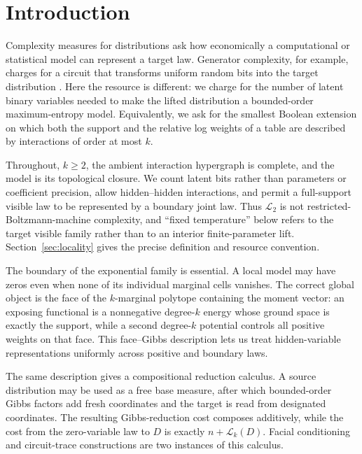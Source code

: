 \documentclass{article}
\newcommand{\LC}{\mathcal{L}}
\begin{document}
\section{Introduction}

Complexity measures for distributions ask how economically a computational or
statistical model can represent a target law.  Generator complexity, for
example, charges for a circuit that transforms uniform random bits into the
target distribution \cite{vi10}.  Here the resource is different: we charge for
the number of latent binary variables needed to make the lifted distribution a
bounded-order maximum-entropy model.  Equivalently, we ask for the smallest
Boolean extension on which both the support and the relative log weights of a
table are described by interactions of order at most $k$.

Throughout, $k\ge2$, the ambient interaction hypergraph is complete, and the
model is its topological closure.  We count latent bits rather than parameters or
coefficient precision, allow hidden--hidden interactions, and permit a
full-support visible law to be represented by a boundary joint law.  Thus
$\LC_2$ is not restricted-Boltzmann-machine complexity, and ``fixed
temperature'' below refers to the target visible family rather than to an
interior finite-parameter lift.  Section~\ref{sec:locality} gives the precise
definition and resource convention.

The boundary of the exponential family is essential.  A local model may have
zeros even when none of its individual marginal cells vanishes.  The correct
global object is the face of the $k$-marginal polytope containing the moment
vector: an exposing functional is a nonnegative degree-$k$ energy whose ground
space is exactly the support, while a second degree-$k$ potential controls all
positive weights on that face.  This face--Gibbs description lets us treat
hidden-variable representations uniformly across positive and boundary laws.

The same description gives a compositional reduction calculus.  A source
distribution may be used as a free base measure, after which bounded-order
Gibbs factors add fresh coordinates and the target is read from designated
coordinates.  The resulting Gibbs-reduction cost composes additively, while
the cost from the zero-variable law to $D$ is exactly
$n+\LC_k(D)$.  Facial conditioning and circuit-trace constructions are two
instances of this calculus.
\end{document}
